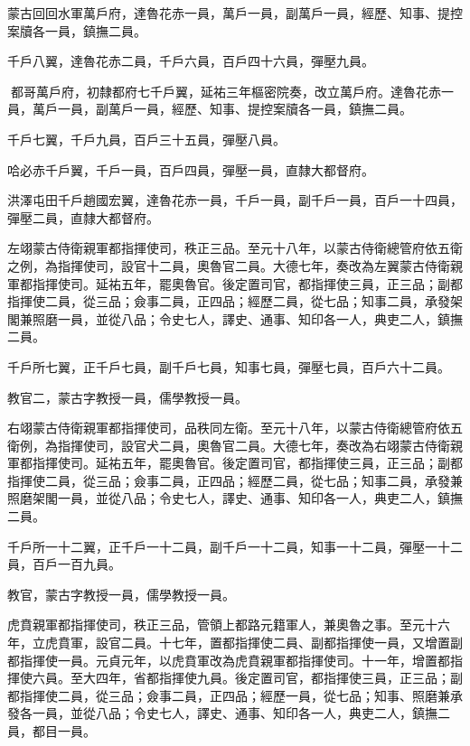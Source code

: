 \begin{pinyinscope}
 蒙古回回水軍萬戶府，達魯花赤一員，萬戶一員，副萬戶一員，經歷、知事、提控案牘各一員，鎮撫二員。



 千戶八翼，達魯花赤二員，千戶六員，百戶四十六員，彈壓九員。



 都哥萬戶府，初隸都府七千戶翼，延祐三年樞密院奏，改立萬戶府。達魯花赤一員，萬戶一員，副萬戶一員，經歷、知事、提控案牘各一員，鎮撫二員。



 千戶七翼，千戶九員，百戶三十五員，彈壓八員。



 哈必赤千戶翼，千戶一員，百戶四員，彈壓一員，直隸大都督府。



 洪澤屯田千戶趙國宏翼，達魯花赤一員，千戶一員，副千戶一員，百戶一十四員，彈壓二員，直隸大都督府。



 左翊蒙古侍衛親軍都指揮使司，秩正三品。至元十八年，以蒙古侍衛總管府依五衛之例，為指揮使司，設官十二員，奧魯官二員。大德七年，奏改為左翼蒙古侍衛親軍都指揮使司。延祐五年，罷奧魯官。後定置司官，都指揮使三員，正三品；副都指揮使二員，從三品；僉事二員，正四品；經歷二員，從七品；知事二員，承發架閣兼照磨一員，並從八品；令史七人，譯史、通事、知印各一人，典吏二人，鎮撫二員。



 千戶所七翼，正千戶七員，副千戶七員，知事七員，彈壓七員，百戶六十二員。



 教官二，蒙古字教授一員，儒學教授一員。



 右翊蒙古侍衛親軍都指揮使司，品秩同左衛。至元十八年，以蒙古侍衛總管府依五衛例，為指揮使司，設官犬二員，奧魯官二員。大德七年，奏改為右翊蒙古侍衛親軍都指揮使司。延祐五年，罷奧魯官。後定置司官，都指揮使三員，正三品；副都指揮使二員，從三品；僉事二員，正四品；經歷二員，從七品；知事二員，承發兼照磨架閣一員，並從八品；令史七人，譯史、通事、知印各一人，典吏二人，鎮撫二員。



 千戶所一十二翼，正千戶一十二員，副千戶一十二員，知事一十二員，彈壓一十二員，百戶一百九員。



 教官，蒙古字教授一員，儒學教授一員。



 虎賁親軍都指揮使司，秩正三品，管領上都路元籍軍人，兼奧魯之事。至元十六年，立虎賁軍，設官二員。十七年，置都指揮使二員、副都指揮使一員，又增置副都指揮使一員。元貞元年，以虎賁軍改為虎賁親軍都指揮使司。十一年，增置都指揮使六員。至大四年，省都指揮使九員。後定置司官，都指揮使三員，正三品；副都指揮使二員，從三品；僉事二員，正四品；經歷一員，從七品；知事、照磨兼承發各一員，並從八品；令史七人，譯史、通事、知印各一人，典吏二人，鎮撫二員，都目一員。




\end{pinyinscope}
